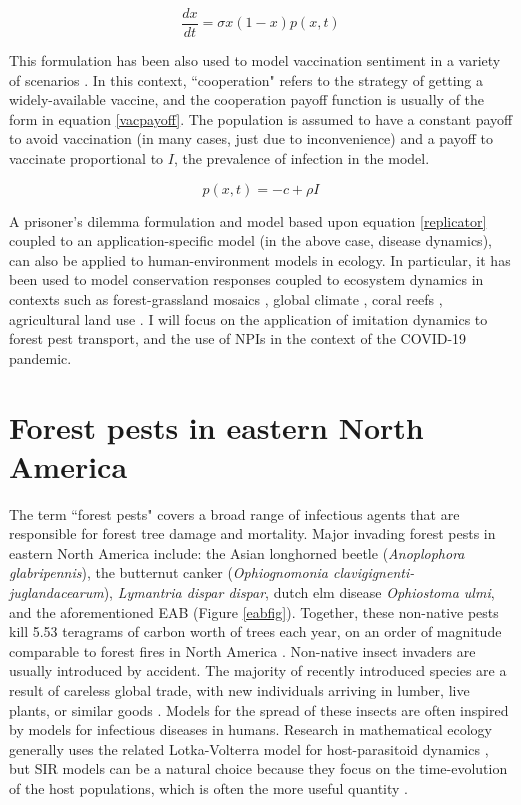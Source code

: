 \begin{equation}
    \frac{dx}{dt} = \sigma x(1 - x)p(x,t) 
    \label{replicator}
\end{equation}


This formulation has been also used to model vaccination sentiment in a variety of scenarios \cite{oraby2014influence,bauch2004vaccination,bauch2005imitation,bauch2012evolutionary}. In this context, ``cooperation" refers to the strategy of getting a widely-available vaccine, and the cooperation payoff function is usually of the form in equation \ref{vacpayoff}. The population is assumed to have a constant payoff to avoid vaccination (in many cases, just due to inconvenience) and a payoff to vaccinate proportional to $I$, the prevalence of infection in the model. 

\begin{equation}
    p(x,t) = - c + \rho I
    \label{vacpayoff}
\end{equation}


A prisoner's dilemma formulation and model based upon equation \ref{replicator} coupled to an application-specific model (in the above case, disease dynamics), can also be applied to human-environment models in ecology. In particular, it has been used to model conservation responses coupled to ecosystem dynamics in contexts such as forest-grassland mosaics \cite{innes2013impact,henderson2016alternative}, global climate \cite{bury2019charting}, coral reefs \cite{thampi2018socio}, agricultural land use \cite{gooding2018forest}. I will focus on the application of imitation dynamics to forest pest transport, and the use of NPIs in the context of the COVID-19 pandemic.


\section{Forest pests in eastern North America}
The term ``forest pests" covers a broad range of infectious agents that are responsible for forest tree damage and mortality. Major invading forest pests in eastern North America include: the Asian longhorned beetle (\textit{Anoplophora glabripennis}), the butternut canker (\textit{Ophiognomonia clavigignenti-juglandacearum}), \textit{Lymantria dispar dispar}, dutch elm disease \textit{Ophiostoma ulmi}, and the aforementioned EAB (Figure \ref{eabfig}). Together, these non-native pests kill 5.53 teragrams of carbon worth of trees each year, on an order of magnitude comparable to forest fires in North America \cite{fei2019biomass}. Non-native insect invaders are usually introduced by accident. The majority of recently introduced species are a result of careless global trade, with new individuals arriving in lumber, live plants, or similar goods \cite{brockerhoff2017ecology}. Models for the spread of these insects are often inspired by models for infectious diseases in humans. Research in mathematical ecology generally uses the related Lotka-Volterra model for host-parasitoid dynamics \cite{edelstein2005mathematical}, but SIR models can be a natural choice because they focus on the time-evolution of the host populations, which is often the more useful quantity \cite{edelstein2005mathematical}. 

